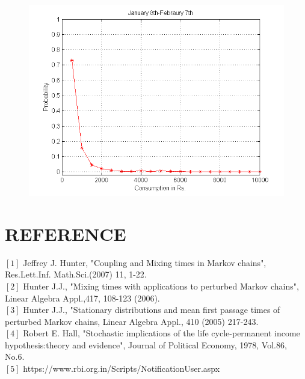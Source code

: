 \documentclass[12pt]{article}
\begin{document}
\begin{figure}
	\centering
	\includegraphics[scale=0.65]{CJAN.png}
	\caption{}
	\label{fig:fig8}
\end{figure}


\newpage
\section{REFERENCE}
\begin{scriptsize}

\begin{small}
$[1]$ Jeffrey J. Hunter, "Coupling and Mixing times in Markov chains", Res.Lett.Inf. Math.Sci.(2007) 11, 1-22.\\
$[2]$ Hunter J.J., "Mixing times with applications to perturbed Markov chains", Linear Algebra Appl.,417, 108-123 (2006). \\
$[3]$ Hunter J.J., "Stationary distributions and mean first passage times of perturbed Markov chains, Linear Algebra Appl., 410 (2005) 217-243. \\
$[4]$ Robert E. Hall, "Stochastic implications of the life cycle-permanent income hypothesis:theory and evidence", Journal of Political Economy, 1978, Vol.86, No.6.
 \\
$[5]$ https://www.rbi.org.in/Scripts/NotificationUser.aspx\\
\end{small}
\end{scriptsize}




 
\end{document}
